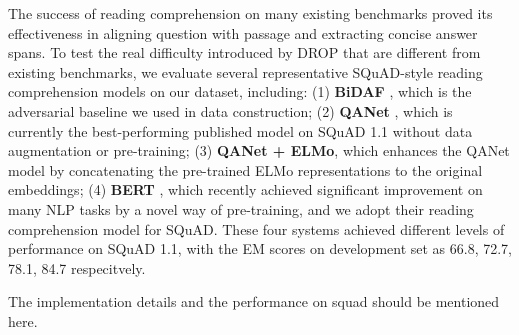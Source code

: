 The success of reading comprehension on many existing benchmarks proved its effectiveness in aligning question with passage and extracting concise answer spans. 
To test the real difficulty introduced by DROP that are different from existing benchmarks, we evaluate several representative SQuAD-style reading comprehension models on our dataset, including:
(1) \textbf{BiDAF} \cite{Seo2016BidirectionalAF}, which is the adversarial baseline we used in data construction; 
(2) \textbf{QANet} \cite{yu2018qanet}, which is currently the best-performing published model on SQuAD 1.1 without data augmentation or pre-training; 
(3) \textbf{QANet + ELMo}, which enhances the QANet model by concatenating the pre-trained ELMo \cite{peters2018elmo} representations to the original embeddings; 
(4) \textbf{BERT} \cite{Devlin2018BERTPO}, which recently achieved significant improvement on many NLP tasks by a novel way of pre-training, and we adopt their reading comprehension model for SQuAD. 
These four systems achieved different levels of performance on SQuAD 1.1, with the EM scores on development set as 66.8, 72.7, 78.1, 84.7 respecitvely.


The implementation details and the performance on squad should be mentioned here.